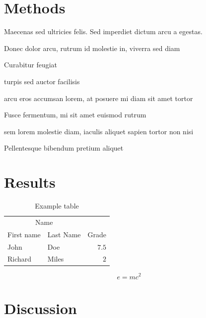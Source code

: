 \documentclass[twoside]{article}
\begin{document}

\section{Methods}

Maecenas sed ultricies felis. Sed imperdiet dictum arcu a egestas. 
\begin{compactitem}
\item Donec dolor arcu, rutrum id molestie in, viverra sed diam
\item Curabitur feugiat
\item turpis sed auctor facilisis
\item arcu eros accumsan lorem, at posuere mi diam sit amet tortor
\item Fusce fermentum, mi sit amet euismod rutrum
\item sem lorem molestie diam, iaculis aliquet sapien tortor non nisi
\item Pellentesque bibendum pretium aliquet
\end{compactitem}
\lipsum[4] %


\section{Results}

\begin{table}[H]
\caption{Example table}
\centering
\begin{tabular}{llr}
\toprule
\multicolumn{2}{c}{Name} \\
\cmidrule(r){1-2}
First name & Last Name & Grade \\
\midrule
John & Doe & $7.5$ \\
Richard & Miles & $2$ \\
\bottomrule
\end{tabular}
\end{table}

\lipsum[5] %

\begin{equation}
\label{eq:emc}
e = mc^2
\end{equation}

\lipsum[6] %


\section{Discussion}
\end{document}
